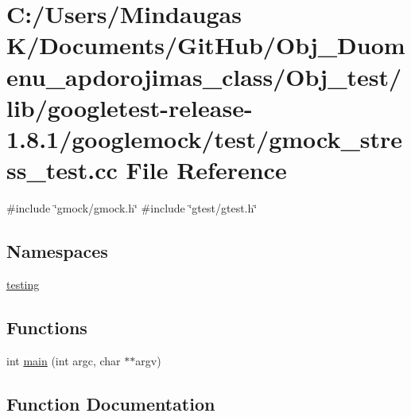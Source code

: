 \hypertarget{_obj__test_2lib_2googletest-release-1_88_81_2googlemock_2test_2gmock__stress__test_8cc}{}\section{C\+:/\+Users/\+Mindaugas K/\+Documents/\+Git\+Hub/\+Obj\+\_\+\+Duomenu\+\_\+apdorojimas\+\_\+class/\+Obj\+\_\+test/lib/googletest-\/release-\/1.8.1/googlemock/test/gmock\+\_\+stress\+\_\+test.cc File Reference}
\label{_obj__test_2lib_2googletest-release-1_88_81_2googlemock_2test_2gmock__stress__test_8cc}
{\ttfamily \#include \char`\"{}gmock/gmock.\+h\char`\"{}}\newline
{\ttfamily \#include \char`\"{}gtest/gtest.\+h\char`\"{}}\newline
\subsection*{Namespaces}
\begin{DoxyCompactItemize}
\item 
 \mbox{\hyperlink{namespacetesting}{testing}}
\end{DoxyCompactItemize}
\subsection*{Functions}
\begin{DoxyCompactItemize}
\item 
int \mbox{\hyperlink{_obj__test_2lib_2googletest-release-1_88_81_2googlemock_2test_2gmock__stress__test_8cc_a3c04138a5bfe5d72780bb7e82a18e627}{main}} (int argc, char $\ast$$\ast$argv)
\end{DoxyCompactItemize}


\subsection{Function Documentation}
\mbox{\label{_obj__test_2lib_2googletest-release-1_88_81_2googlemock_2test_2gmock__stress__test_8cc_a3c04138a5bfe5d72780bb7e82a18e627}} 
